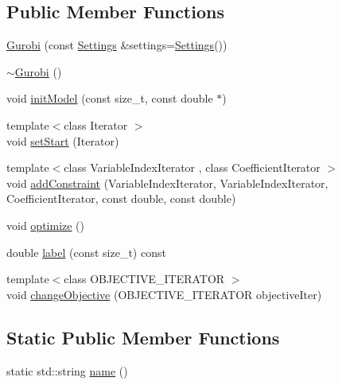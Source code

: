 \subsection*{Public Member Functions}
\begin{DoxyCompactItemize}
\item 
\hyperlink{classnifty_1_1ilp__backend_1_1Gurobi_abcd8d8d449cbac006855470e361535b2}{Gurobi} (const \hyperlink{classnifty_1_1ilp__backend_1_1Gurobi_ae07f9785d50e89fef9df8ac94eba5010}{Settings} \&settings=\hyperlink{classnifty_1_1ilp__backend_1_1Gurobi_ae07f9785d50e89fef9df8ac94eba5010}{Settings}())
\item 
\hyperlink{classnifty_1_1ilp__backend_1_1Gurobi_ab8e373ce16adba177e9341a2d0e55157}{$\sim$\+Gurobi} ()
\item 
void \hyperlink{classnifty_1_1ilp__backend_1_1Gurobi_ac4ee3e8981df207094a6580f07f2685d}{init\+Model} (const size\+\_\+t, const double $\ast$)
\item 
{\footnotesize template$<$class Iterator $>$ }\\void \hyperlink{classnifty_1_1ilp__backend_1_1Gurobi_a0875ce6a8a39917a496ec650c68da6a0}{set\+Start} (Iterator)
\item 
{\footnotesize template$<$class Variable\+Index\+Iterator , class Coefficient\+Iterator $>$ }\\void \hyperlink{classnifty_1_1ilp__backend_1_1Gurobi_ad4e3fa2d4f5fe726a46d40857c36a918}{add\+Constraint} (Variable\+Index\+Iterator, Variable\+Index\+Iterator, Coefficient\+Iterator, const double, const double)
\item 
void \hyperlink{classnifty_1_1ilp__backend_1_1Gurobi_a2521e51c0cdfb1e029d332ab7f203021}{optimize} ()
\item 
double \hyperlink{classnifty_1_1ilp__backend_1_1Gurobi_afbdf38456bb7ce8110168dd3aa7f691f}{label} (const size\+\_\+t) const 
\item 
{\footnotesize template$<$class O\+B\+J\+E\+C\+T\+I\+V\+E\+\_\+\+I\+T\+E\+R\+A\+T\+O\+R $>$ }\\void \hyperlink{classnifty_1_1ilp__backend_1_1Gurobi_a138de39ce46740b4728b9d2e7f8bd27b}{change\+Objective} (O\+B\+J\+E\+C\+T\+I\+V\+E\+\_\+\+I\+T\+E\+R\+A\+T\+O\+R objective\+Iter)
\end{DoxyCompactItemize}
\subsection*{Static Public Member Functions}
\begin{DoxyCompactItemize}
\item 
static std\+::string \hyperlink{classnifty_1_1ilp__backend_1_1Gurobi_a3c80f9769e9f33482397305e234b0aa7}{name} ()
\end{DoxyCompactItemize}


